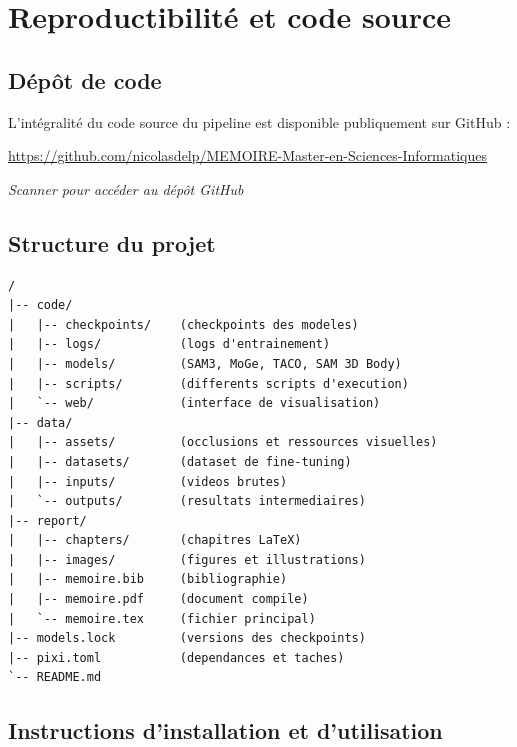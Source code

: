 \chapter{Reproductibilité et code source} \label{ann:reproducibility}

\section*{Dépôt de code}

L'intégralité du code source du pipeline est disponible publiquement sur GitHub :

\begin{center}
  \url{https://github.com/nicolasdelp/MEMOIRE-Master-en-Sciences-Informatiques}

  \vspace{0.5em}
  
  \vspace{0.3em}
  {\small \textit{Scanner pour accéder au dépôt GitHub}}
\end{center}

\section*{Structure du projet}

\begin{lstlisting}[style=tree]
/
|-- code/
|   |-- checkpoints/    (checkpoints des modeles)
|   |-- logs/           (logs d'entrainement)
|   |-- models/         (SAM3, MoGe, TACO, SAM 3D Body)
|   |-- scripts/        (differents scripts d'execution)
|   `-- web/            (interface de visualisation)
|-- data/
|   |-- assets/         (occlusions et ressources visuelles)
|   |-- datasets/       (dataset de fine-tuning)
|   |-- inputs/         (videos brutes)
|   `-- outputs/        (resultats intermediaires)
|-- report/
|   |-- chapters/       (chapitres LaTeX)
|   |-- images/         (figures et illustrations)
|   |-- memoire.bib     (bibliographie)
|   |-- memoire.pdf     (document compile)
|   `-- memoire.tex     (fichier principal)
|-- models.lock         (versions des checkpoints)
|-- pixi.toml           (dependances et taches)
`-- README.md
\end{lstlisting}

\section*{Instructions d'installation et d'utilisation}

